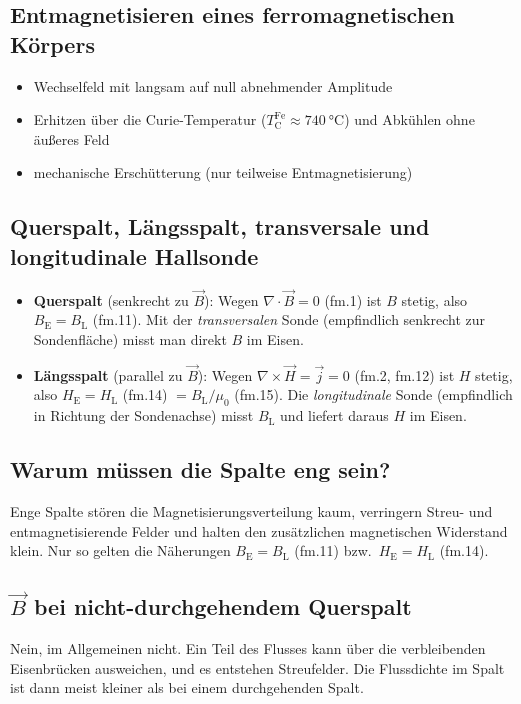 \documentclass[a4paper,11pt]{article}
\begin{document}
\subsection{Entmagnetisieren eines ferromagnetischen Körpers}
\begin{itemize}
  \item Wechselfeld mit langsam auf null abnehmender Amplitude
  \item Erhitzen über die Curie-Temperatur ($T_\mathrm{C}^{\text{Fe}}\approx\SI{740}{\celsius}$) und Abkühlen ohne äußeres Feld
  \item mechanische Erschütterung (nur teilweise Entmagnetisierung)
\end{itemize}

\subsection{Querspalt, Längsspalt, transversale und longitudinale Hallsonde}
\label{sec:spalte}
\begin{itemize}
  \item \textbf{Querspalt} (senkrecht zu $\vec B$): Wegen $\nabla\cdot\vec B=0$
        (fm.1) ist $B$ stetig, also $B_\mathrm{E}=B_\mathrm{L}$ (fm.11). Mit der
        \emph{transversalen} Sonde (empfindlich senkrecht zur Sondenfläche)
        misst man direkt $B$ im Eisen.
  \item \textbf{Längsspalt} (parallel zu $\vec B$): Wegen
        $\nabla\times\vec H=\vec j=0$ (fm.2, fm.12) ist $H$ stetig, also
        $H_\mathrm{E}=H_\mathrm{L}$ (fm.14) $=B_\mathrm{L}/\mu_0$ (fm.15). Die
        \emph{longitudinale} Sonde (empfindlich in Richtung der Sondenachse)
        misst $B_\mathrm{L}$ und liefert daraus $H$ im Eisen.
\end{itemize}

\subsection{Warum müssen die Spalte eng sein?}
Enge Spalte stören die Magnetisierungsverteilung kaum, verringern Streu- und
entmagnetisierende Felder und halten den zusätzlichen magnetischen Widerstand
klein. Nur so gelten die Näherungen $B_\mathrm{E}=B_\mathrm{L}$ (fm.11) bzw.\
$H_\mathrm{E}=H_\mathrm{L}$ (fm.14).

\subsection{$\vec B$ bei nicht-durchgehendem Querspalt}
Nein, im Allgemeinen nicht. Ein Teil des Flusses kann über die verbleibenden
Eisenbrücken ausweichen, und es entstehen Streufelder. Die Flussdichte im Spalt
ist dann meist kleiner als bei einem durchgehenden Spalt.
\end{document}
